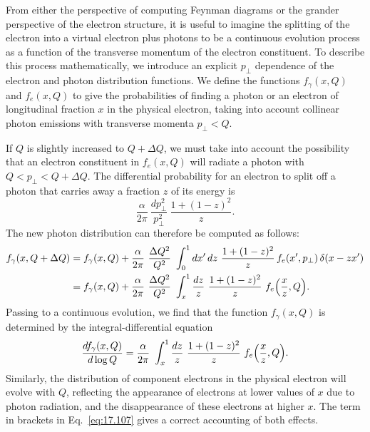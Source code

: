 From either the perspective of computing Feynman diagrams or the grander
perspective of the electron structure, it is useful to imagine the splitting
of the electron into a virtual electron plus photons to be a continuous
evolution process as a function of the transverse momentum of the electron
constituent.  To describe this process mathematically, we introduce an
explicit $p_\perp$ dependence of the electron and photon distribution
functions.  We define the functions $f_\gamma(x, Q)$ and $f_e(x, Q)$ to give
the probabilities of finding a photon or an electron of longitudinal fraction
$x$ in the physical electron, taking into account collinear photon emissions
with transverse momenta $p_\perp < Q$.

If $Q$ is slightly increased to $Q + \Delta Q$, we must take into account the
possibility that an electron constituent in $f_e(x, Q)$ will radiate a photon
with $Q < p_\perp < Q + \Delta Q$.  The differential probability for an
electron to split off a photon that carries away a fraction $z$ of its energy
is
\begin{equation}
  \frac{\alpha}{2\pi}\ \frac{dp_\perp^2}{p_\perp^2}\ \frac{1+(1-z)^2}{z} .
  \label{eq:17.110}
\end{equation}
The new photon distribution can therefore be computed as follows:
\begin{equation}
  \begin{aligned}
    f_\gamma(x, Q + \Delta Q) &= f_\gamma(x, Q) + \frac{\alpha}{2\pi}\
      \frac{\Delta Q^2}{Q^2}\ \int_0^1 dx'\,dz\ \frac{1+(1-z)^2}{z}\,
      f_e(x', p_\perp)\,\delta(x - zx')\\
    &= f_\gamma(x, Q) + \frac{\alpha}{2\pi}\ \frac{\Delta Q^2}{Q^2}\
      \int_x^1 \frac{dz}{z}\ \frac{1+(1-z)^2}{z}\ f_e\Bigl(
        \frac{x}{z}, Q \Bigr) .
  \end{aligned}
  \label{eq:17.111}
\end{equation}
Passing to a continuous evolution, we find that the function $f_\gamma(x, Q)$
is determined by the integral-differential equation
\begin{equation}
  \frac{df_\gamma(x, Q)}{d\log Q} = \frac{\alpha}{2\pi}\ \int_x^1 \frac{dz}{z}\
    \frac{1+(1-z)^2}{z}\ f_e\Bigl( \frac{x}{z}, Q \Bigr) .
  \label{eq:17.112}
\end{equation}
Similarly, the distribution of component electrons in the physical electron
will evolve with $Q$, reflecting the appearance of electrons at lower values
of $x$ due to photon radiation, and the disappearance of these electrons at
higher $x$.  The term in brackets in Eq.~\eqref{eq:17.107} gives a correct
accounting of both effects.


